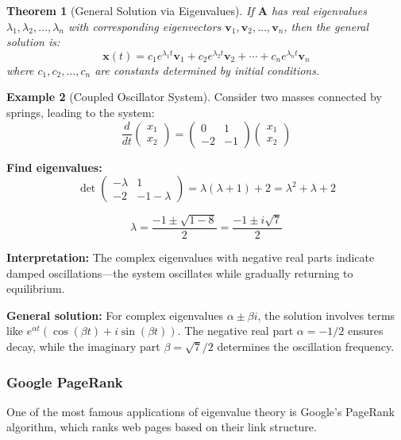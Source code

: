 \documentclass[12pt]{article}
\numberwithin{equation}{section}
\newcommand{\vect}[1]{\boldsymbol{#1}}   %
\newcommand{\mat}[1]{\mathbf{#1}}        %
\theoremstyle{plain}
\newtheorem{theorem}{Theorem}[section]
\theoremstyle{definition}
\newtheorem{example}[theorem]{Example}
\theoremstyle{remark}
\begin{document}
\begin{theorem}[General Solution via Eigenvalues]
If $\mat{A}$ has real eigenvalues $\lambda_1, \lambda_2, \ldots, \lambda_n$ with corresponding eigenvectors $\vect{v}_1, \vect{v}_2, \ldots, \vect{v}_n$, then the general solution is:
$$\vect{x}(t) = c_1 e^{\lambda_1 t}\vect{v}_1 + c_2 e^{\lambda_2 t}\vect{v}_2 + \cdots + c_n e^{\lambda_n t}\vect{v}_n$$
where $c_1, c_2, \ldots, c_n$ are constants determined by initial conditions.
\end{theorem}

\begin{example}[Coupled Oscillator System]
Consider two masses connected by springs, leading to the system:
$$\frac{d}{dt}\begin{pmatrix} x_1 \\ x_2 \end{pmatrix} = \begin{pmatrix} 0 & 1 \\ -2 & -1 \end{pmatrix}\begin{pmatrix} x_1 \\ x_2 \end{pmatrix}$$

\textbf{Find eigenvalues:}
$$\det\begin{pmatrix} -\lambda & 1 \\ -2 & -1-\lambda \end{pmatrix} = \lambda(\lambda+1) + 2 = \lambda^2 + \lambda + 2$$

$$\lambda = \frac{-1 \pm \sqrt{1-8}}{2} = \frac{-1 \pm i\sqrt{7}}{2}$$

\textbf{Interpretation:} The complex eigenvalues with negative real parts indicate damped oscillations—the system oscillates while gradually returning to equilibrium.

\textbf{General solution:} For complex eigenvalues $\alpha \pm \beta i$, the solution involves terms like $e^{\alpha t}(\cos(\beta t) + i\sin(\beta t))$. The negative real part $\alpha = -1/2$ ensures decay, while the imaginary part $\beta = \sqrt{7}/2$ determines the oscillation frequency.
\end{example}

\subsubsection{Google PageRank}

One of the most famous applications of eigenvalue theory is Google's PageRank algorithm, which ranks web pages based on their link structure.
\end{document}
